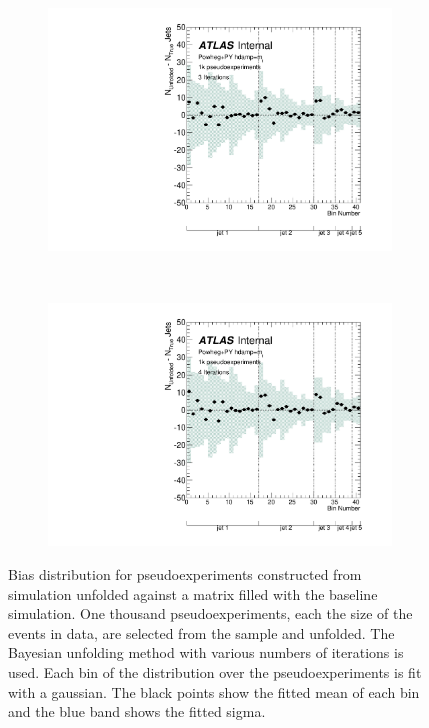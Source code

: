 \begin{figure}
\begin{subfigure}[]{0.5\textwidth}
\includegraphics[width=\textwidth]{fig/Stress/110404atlfast/Bias3Iterations.pdf}
\end{subfigure}
~
\begin{subfigure}[]{0.5\textwidth}
\includegraphics[width=\textwidth]{fig/Stress/110404atlfast/Bias4Iterations.pdf}
\end{subfigure}
\caption{Bias distribution for pseudoexperiments constructed from \hdamp~ simulation unfolded against a matrix filled with the baseline simulation. One thousand pseudoexperiments, each the size of the events in data, are selected from the sample and unfolded. The Bayesian unfolding method with various numbers of iterations is used. Each bin of the distribution over the pseudoexperiments is fit with a gaussian. The black points show the fitted mean of each bin and the blue band shows the fitted sigma. }
\label{fig:hdampbias}
\end{figure}
